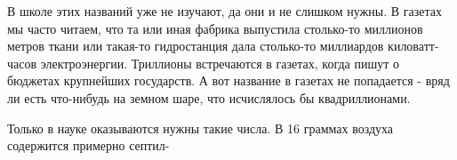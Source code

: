 \begin{multicols}{2}
В школе этих названий уже не изучают, да они и не слишком нужны. В газетах мы часто читаем, что та или иная фабрика выпустила столько-то миллионов метров ткани или такая-то гидростанция дала столько-то миллиардов киловатт-часов электроэнергии. Триллионы встречаются в газетах, когда пишут о бюджетах крупнейших государств. А вот название  в газетах не попадается - вряд ли есть что-нибудь на земном шаре, что исчислялось бы квадриллионами.

Только в науке оказываются нужны такие числа. В 16 граммах воздуха содержится примерно септил-

\end{multicols}
